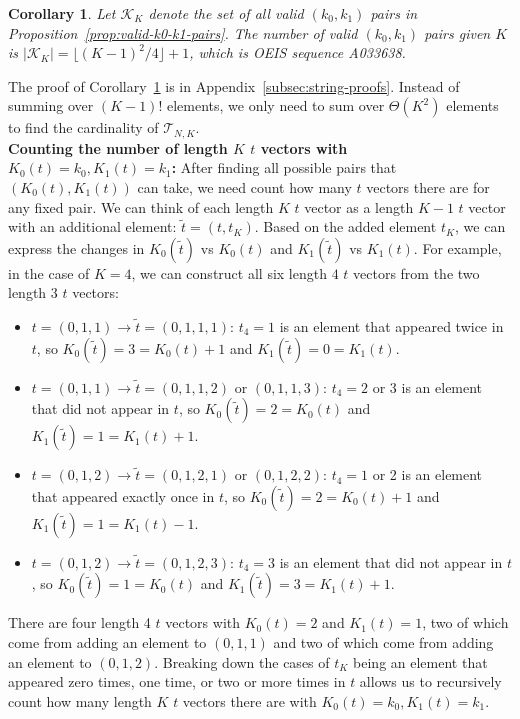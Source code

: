 \documentclass{article}
\newtheorem{corollary}[theorem]{Corollary}
\begin{document}
\begin{corollary}\label{eq:k0_k1_pairs_cardinality}
Let $\mathcal{K}_K$ denote the set of all valid $(k_0, k_1)$ pairs in Proposition~\ref{prop:valid-k0-k1-pairs}. The number of valid $(k_0, k_1)$ pairs given $K$ is $|\mathcal{K}_K| = \lfloor (K-1)^2/4\rfloor + 1$, which is OEIS sequence A033638.
\end{corollary}
The proof of Corollary~\ref{eq:k0_k1_pairs_cardinality} is in Appendix~\ref{subsec:string-proofs}. Instead of summing over $(K-1)!$ elements, we only need to sum over $\Theta(K^2)$ elements to find the cardinality of $\mathcal{T}_{N,K}$. \\ 

\noindent \textbf{Counting the number of length $K$ $t$ vectors with $K_0(t)=k_0, K_1(t)=k_1$:} After finding all possible pairs that $(K_0(t), K_1(t))$ can take, we need count how many $t$ vectors there are for any fixed pair. We can think of each length $K$ $t$ vector as a length $K-1$ $t$ vector with an additional element: $\tilde{t} = (t, t_K)$. Based on the added element $t_K$, we can express the changes in $K_0(\tilde{t})$ vs $K_0(t)$ and $K_1(\tilde{t})$ vs $K_1(t)$. For example, in the case of $K=4$, we can construct all six length $4$ $t$ vectors from the two length 3 $t$ vectors: 
\begin{itemize}
    \item $t=(0,1,1) \rightarrow \tilde{t} = (0,1,1,1)$: $t_4=1$ is an element that appeared twice in $t$, so $K_0(\tilde{t})= 3= K_0(t)+1$ and $K_1(\tilde{t}) = 0 = K_1(t)$. 
    \item $t=(0,1,1)\rightarrow \tilde{t} = (0,1,1,2)$ or $(0,1,1,3)$: $t_4=2$ or 3 is an element that did not appear in $t$, so $K_0(\tilde{t})= 2= K_0(t)$ and $K_1(\tilde{t}) = 1 = K_1(t)+1$. 
    \item $t=(0,1,2) \rightarrow \tilde{t} = (0,1,2,1)$ or $(0,1,2,2)$: $t_4=1$ or 2 is an element that appeared exactly once in $t$, so $K_0(\tilde{t})= 2= K_0(t)+1$ and $K_1(\tilde{t}) = 1 = K_1(t)-1$. 
    \item $t=(0,1,2) \rightarrow \tilde{t} =  (0,1,2,3)$: $t_4=3$ is an element that did not appear in $t$, so $K_0(\tilde{t})= 1= K_0(t)$ and $K_1(\tilde{t}) = 3 = K_1(t)+1$. 
\end{itemize}
There are four length 4 $t$ vectors with $K_0(t)=2$ and $K_1(t)=1$, two of which come from adding an element to $(0,1,1)$ and two of which come from adding an element to $(0,1,2)$. Breaking down the cases of $t_K$ being an element that appeared zero times, one time, or two or more times in $t$ allows us to recursively count how many length $K$ $t$ vectors there are with $K_0(t)=k_0, K_1(t)=k_1$. 
\end{document}
